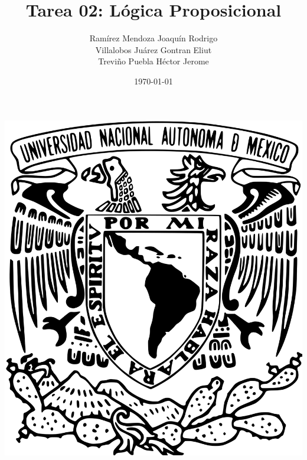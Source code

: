 \documentclass[oneside]{book}
\title{Tarea 02: Lógica Proposicional}
\author{Ramírez Mendoza Joaquín Rodrigo\\
Villalobos Juárez Gontran Eliut\\
Treviño Puebla Héctor Jerome}
\date{\today}
\begin{document}
\begin{titlepage}
	\begin{minipage}{3cm}
		\begin{center}
			\includegraphics[height = 0.14\textheight]{recursos/Logo_UNAM.png}\par
		\end{center}
	\end{minipage}\hfill
	\begin{minipage}{10cm}


\end{minipage}
\end{titlepage}
\end{document}
